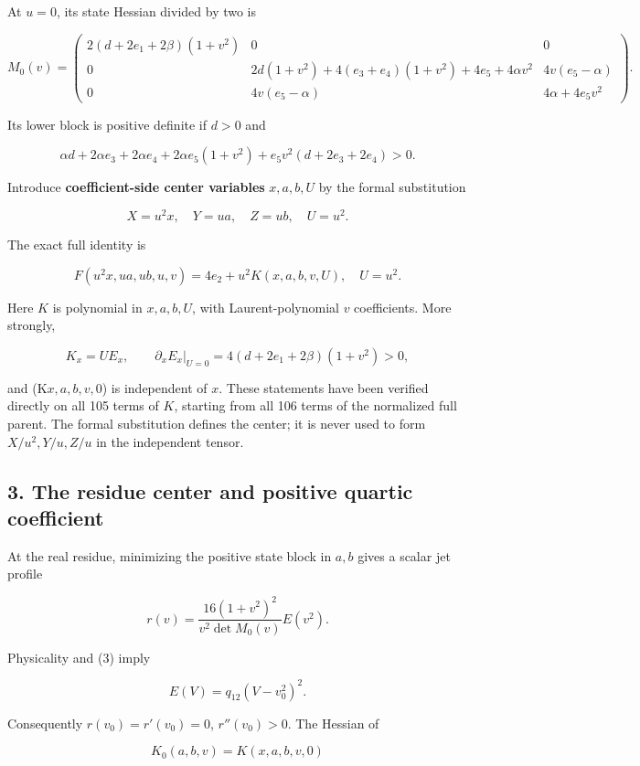 At \(u=0\), its state Hessian divided by two is

\[
M_0(v)=
\begin{pmatrix}
2(d+2e_1+2\beta)(1+v^2)&0&0\\
0&2d(1+v^2)+4(e_3+e_4)(1+v^2)+4e_5+4\alpha v^2
 &4v(e_5-\alpha)\\
0&4v(e_5-\alpha)&4\alpha+4e_5v^2
\end{pmatrix}.
\tag{5}
\]

Its lower block is positive definite if \(d>0\) and

\[
\alpha d+2\alpha e_3+2\alpha e_4+2\alpha e_5(1+v^2)
+e_5v^2(d+2e_3+2e_4)>0.
\]

Introduce \textbf{coefficient-side center variables} \(x,a,b,U\) by the formal
substitution

\[
X=u^2x,\quad Y=ua,\quad Z=ub,\quad U=u^2.
\]

The exact full identity is

\[
F(u^2x,ua,ub,u,v)=4e_2+u^2K(x,a,b,v,U),
\quad U=u^2.
\tag{6}
\]

Here \(K\) is polynomial in \(x,a,b,U\), with Laurent-polynomial \(v\)
coefficients. More strongly,

\[
K_x=U E_x,\qquad
\partial_x E_x\big|_{U=0}=4(d+2e_1+2\beta)(1+v^2)>0,
\tag{7}
\]

and (K\(x,a,b,v,0\)) is independent of \(x\). These statements have been
verified directly on all 105 terms of \(K\), starting from all 106 terms of
the normalized full parent. The formal substitution defines the center;
it is never used to form \(X/u^2,Y/u,Z/u\) in the independent tensor.

\hypertarget{the-residue-center-and-positive-quartic-coefficient}{%
\subsection{3. The residue center and positive quartic coefficient}\label{p4ec1a51262f9:the-residue-center-and-positive-quartic-coefficient}}

At the real residue, minimizing the positive state block in \(a,b\) gives
a scalar jet profile

\[
r(v)=\frac{16(1+v^2)^2}{v^2\det M_0(v)}E(v^2).
\tag{8}
\]

Physicality and (3) imply

\[
E(V)=q_{12}(V-v_0^2)^2.
\]

Consequently \(r(v_0)=r'(v_0)=0\), \(r''(v_0)>0\). The Hessian of

\[
K_0(a,b,v)=K(x,a,b,v,0)
\]

